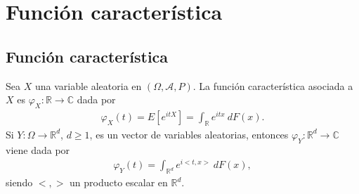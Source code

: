 \chapter{Función característica}

\section{Función característica}

\begin{defi}
Sea $X$ una variable aleatoria en $(\Omega, \mathcal{A}, P)$. La función característica asociada a $X$ es $\varphi_X : \mathbb{R} \longrightarrow \mathbb{C}$ dada por
\begin{align*}
    \varphi_X(t) = E\left[ e^{itX} \right] = \int_{\mathbb{R}} e^{itx} \ dF(x).
\end{align*}
Si $Y : \Omega \longrightarrow \mathbb{R}^d$, $d \ge 1$, es un vector de variables aleatorias, entonces $\varphi_Y : \mathbb{R}^d \longrightarrow \mathbb{C}$ viene dada por
\begin{align*}
    \varphi_Y(t) = \int_{\mathbb{R}^d} e^{i<t,x>} \ dF(x),
\end{align*}
siendo $<,>$ un producto escalar en $\mathbb{R}^d$.
\end{defi}

